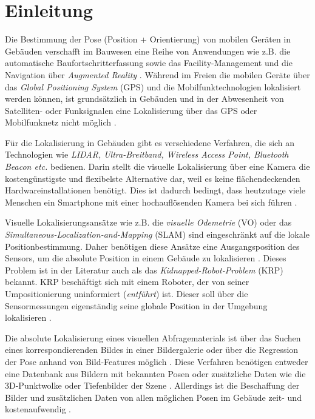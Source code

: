 
\section{Einleitung}
Die Bestimmung der Pose (Position + Orientierung) von mobilen Geräten in Gebäuden verschafft im Bauwesen eine Reihe von Anwendungen wie z.B. die automatische Baufortschritterfassung sowie das Facility-Management und die Navigation über \textit{Augmented Reality} \cite{kroppModelbasedPoseEstimation2016, kochNaturalMarkersAugmented2014}.
Während im Freien die mobilen Geräte über das \textit{Global Positioning System} (GPS) und die Mobilfunktechnologien lokalisiert werden können, ist grundsätzlich in Gebäuden und in der Abwesenheit von Satelliten- oder Funksignalen eine Lokalisierung über das GPS oder Mobilfunknetz nicht möglich \cite{yassinRecentAdvancesIndoor2016}. 

Für die Lokalisierung in Gebäuden gibt es verschiedene Verfahren, die sich an Technologien wie \textit{LIDAR, Ultra-Breitband, Wireless Access Point, Bluetooth Beacon etc.} bedienen. Darin stellt die visuelle Lokalisierung über eine Kamera die kostengünstigste und flexibelste Alternative dar, weil es keine flächendeckenden Hardwareinstallationen benötigt. Dies ist dadurch bedingt, dass heutzutage viele Menschen ein Smartphone mit einer hochauflösenden Kamera bei sich führen \cite{wuImagebasedCameraLocalization2018}.

Visuelle Lokalisierungsansätze wie z.B. die 
\textit{visuelle Odemetrie} (VO) oder das \textit{Simultaneous-Localization-and-Mapping} (SLAM) sind eingeschränkt auf die lokale Positionbestimmung. Daher benötigen diese Ansätze eine Ausgangsposition des Sensors, um die absolute Position in einem Gebäude zu lokalisieren \cite{stephenseGlobalLocalizationUsing2002}. Dieses Problem ist in der Literatur auch als das \textit{Kidnapped-Robot-Problem} (KRP) bekannt. KRP beschäftigt sich mit einem  Roboter, der von seiner Umpositionierung uninformiert (\textit{entführt}) ist. Dieser soll über die Sensormessungen eigenständig seine globale Position in der Umgebung lokalisieren  \cite{acharyaBIMPoseNetIndoorCamera2019}.


Die absolute Lokalisierung eines visuellen Abfragematerials ist über das Suchen eines korrespondierenden Bildes in einer Bildergalerie oder über die Regression der Pose anhand von Bild-Features möglich \cite{piascoSurveyVisualBasedLocalization2018}. Diese Verfahren benötigen entweder eine Datenbank aus Bildern mit bekannten Posen \cite{zhangImageBasedLocalization2006, arandjelovicThreeThingsEveryone2012} oder zusätzliche Daten wie die 3D-Punktwolke \cite{irscharaStructurefrommotionPointClouds2009, liWorldwidePoseEstimation2012} oder Tiefenbilder der Szene \cite{shottonSceneCoordinateRegression2013}. Allerdings ist die Beschaffung der Bilder und zusätzlichen Daten von allen möglichen Posen im Gebäude zeit- und kostenaufwendig \cite{acharyaBIMPoseNetIndoorCamera2019}.


